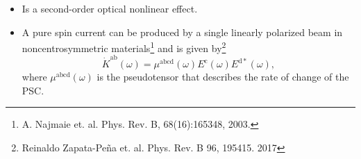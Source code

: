 \documentclass{beamer}
\begin{document}
\begin{frame}
\begin{columns}
\begin{figure}[h!]
\end{figure}


\end{columns}

\end{frame}


\begin{frame}



\vspace{3mm}

\begin{itemize}

\item 
Is a second-order optical nonlinear effect.

\vspace{3mm}

\item 
A pure spin current can be produced by a single linearly polarized beam in
noncentrosymmetric materials\footnote[frame]{\tiny A. Najmaie
et. al. Phys. Rev. B, 68(16):165348, 2003.} and is given by\footnote[frame]
{\tiny Reinaldo Zapata-Pe\~na et. al. Phys. Rev. B 96, 195415. 2017}
\begin{equation}
\dot{K}^{\mathrm{ab}}(\omega) =
\mu^{\mathrm{abcd}}(\omega)
E^{\mathrm{c}}(\omega) E^{\mathrm{d*}}(\omega),
\label{eq:dotk}
\end{equation}
where $\mu^{\mathrm{abcd}}(\omega)$ is the pseudotensor that describes the rate
of change of the PSC.

\end{itemize}

\end{frame}
\end{document}
